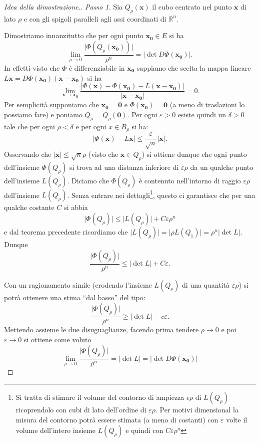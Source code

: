 \documentclass[italian,a4paper]{scrartcl}
\newcommand{\RR}{{\mathbb R}}
\newcommand{\eps}{\varepsilon}
\newcommand{\defeq}{=}
\renewcommand{\vec}{\mathbf}
\begin{document}
\begin{proof}[Idea della dimostrazione.]
\emph{Passo 1.}
Sia $Q_\rho(\vec x)$ il cubo centrato nel punto $\vec x$
di lato $\rho$ e con gli spigoli paralleli agli assi coordinati
di $\RR^n$.

Dimostriamo innanzitutto che per ogni punto $\vec{x_0}\in E$
si ha
\[
  \lim_{\rho\to 0} \frac{\lvert\Phi(Q_\rho(\vec {x_0}))\rvert}{\rho^n} 
  = \lvert \det D\Phi(\vec{x_0})\rvert.
\]
In effetti visto che $\Phi$ è differenziabile in $\vec {x_0}$ 
sappiamo che scelta la mappa lineare $L\vec x = D\Phi(\vec {x_0})(\vec
x-\vec {x_0})$
si ha
\[
\lim_{\vec x\to \vec{x_0}} \frac{\lvert \Phi(\vec x) - \Phi(\vec{x_0})
  - L(\vec x-\vec{x_0}) \rvert}{|\vec x-\vec {x_0}|} = 0.
\]
Per semplicità supponiamo che $\vec{x_0}=\vec 0$ e
$\Phi(\vec{x_0})=\vec 0$ (a meno di
traslazioni lo possiamo fare) e poniamo $Q_\rho \defeq Q_\rho(\vec 0)$.
Per ogni $\eps>0$ esiste quindi un $\delta>0$ tale che per ogni
$\rho<\delta$ 
e per ogni $x\in B_\rho$ si ha:
\[
\lvert \Phi(\vec x) - L\vec x \rvert \le \frac{\eps}{\sqrt n}|\vec x|.
\]
Osservando che $|\vec x| \le \sqrt n \rho$ (visto che $\vec x \in Q_\rho$) 
si ottiene dunque
che ogni punto dell'insieme $\Phi(Q_\rho)$ si trova ad una
distanza inferiore di $\eps \rho$ da un qualche punto dell'insieme
$L(Q_\rho)$. Diciamo che $\Phi(Q_\rho)$ è contenuto 
nell'intorno di raggio $\eps\rho$ dell'insieme $L(Q_\rho)$.
Senza entrare nei dettagli\footnote{Si tratta di stimare il volume del
contorno di ampiezza $\epsilon \rho$ di $L(Q_\rho)$ ricoprendolo con cubi di lato
dell'ordine di $\eps\rho$. 
Per motivi dimensional la misura del contorno
potrà essere stimata (a meno di costanti) con $\eps$ volte il volume
dell'intero insieme 
$L(Q_\rho)$ e quindi con $C\eps\rho^n$}, questo ci
garantisce che per una qualche costante $C$ si abbia
\[
  \lvert \Phi(Q_\rho) \rvert \le \lvert L(Q_\rho)\rvert + C \eps \rho^n
\]
e dal teorema precedente ricordiamo che $\lvert L(Q_\rho)\rvert
=\lvert \rho L (Q_1)\rvert = \rho^n\lvert \det L\rvert$. Dunque
\[
\frac{\lvert \Phi(Q_\rho) \rvert}{\rho^n} 
\le \lvert \det L\rvert + C\eps.
\]

Con un ragionamento simile (erodendo l'insieme $L(Q_\rho)$ di una
quantità $\eps\rho$) si potrà ottenere una stima ``dal basso'' del tipo:
\[
\frac{\lvert \Phi(Q_\rho)\rvert}{\rho^n} \ge \lvert \det L \rvert - c \eps.
\]
Mettendo assieme le due disuguaglianze, facendo prima tendere $\rho\to
0$ e poi $\eps\to 0$ si ottiene come voluto
\[
\lim_{\rho \to 0} \frac{\lvert \Phi(Q_\rho) \rvert}{\rho^n} 
= \lvert \det L \rvert = \lvert \det D\Phi(\vec {x_0})\rvert
\]


\end{proof}
\end{document}
